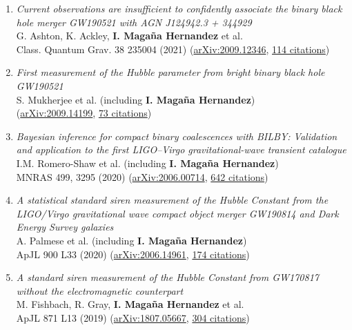 \documentclass[letterpaper,10pt]{article}
\newcommand{\publicationArxiv}[5]{%
\emph{#1}\\
#2\\
(\href{#3}{#4}, \underline{#5 citations})}
\newcommand{\publicationJournal}[6]{%
\emph{#1}\\
#2\\
#3 (\href{#4}{#5}, \underline{#6 citations})}
\begin{document}
\begin{enumerate}
\item
    \publicationJournal{Current observations are insufficient to confidently associate the binary black hole merger GW190521 with AGN J124942.3 + 344929}{G. Ashton, K. Ackley, \textbf{I. Maga\~na Hernandez} et al.}{Class. Quantum Grav. 38 235004 (2021)}{https://arxiv.org/abs/2009.12346}{arXiv:2009.12346}{114}
\item
    \publicationArxiv{First measurement of the Hubble parameter from bright binary black hole GW190521}{S. Mukherjee et al. (including \textbf{I. Maga\~na Hernandez})}{https://arxiv.org/abs/2009.14199}{arXiv:2009.14199}{73}
\item
    \publicationJournal{Bayesian inference for compact binary coalescences with BILBY: Validation and application to the first LIGO--Virgo gravitational-wave transient catalogue}{I.M. Romero-Shaw et al. (including \textbf{I. Maga\~na Hernandez})}{MNRAS 499, 3295 (2020)}{https://arxiv.org/abs/2006.00714}{arXiv:2006.00714}{642}
\item
    \publicationJournal{A statistical standard siren measurement of the Hubble Constant from the LIGO/Virgo gravitational wave compact object merger GW190814 and Dark Energy Survey galaxies}{A. Palmese et al. (including \textbf{I. Maga\~na Hernandez})}{ApJL 900 L33 (2020)}{https://arxiv.org/abs/2006.14961}{arXiv:2006.14961}{174}
\item
    \publicationJournal{A standard siren measurement of the Hubble Constant from GW170817 without the electromagnetic counterpart}{M. Fishbach, R. Gray, \textbf{I. Maga\~na Hernandez} et al.}{ApJL 871 L13 (2019)}{https://arxiv.org/abs/1807.05667}{arXiv:1807.05667}{304}
\end{enumerate}
\end{document}
